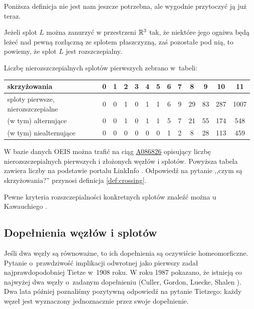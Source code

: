 Poniższa definicja nie jest nam jeszcze potrzebna, ale wygodnie przytoczyć ją już teraz.

\begin{definition}[rozszczepialność]
%
    Jeżeli splot $L$ można zanurzyć w przestrzeni $\mathbb R^3$ tak, że niektóre jego ogniwa będą leżeć nad pewną rozłączną ze splotem płaszczyzną, zaś pozostałe pod nią, to powiemy, że splot $L$ jest rozszczepialny.
\end{definition}

Liczbę nierozszczepialnych splotów pierwszych zebrano w~tabeli:

\renewcommand*{\arraystretch}{1.4}
\footnotesize
\begin{longtable}{lcccccccccccc}
    \hline
    \textbf{skrzyżowania} & 0 & 1 & 2 & 3 & 4 & 5 &  6 &  7 &  8 & 9 & 10 & 11 \\ \hline \endhead
    sploty pierwsze, nierozszczepialne & 0 & 0 & 1 & 0 & 1 & 1 & 6 & 9 & 29 & 83 & 287 & 1007 \\
    (w tym) alternujące & 0 & 0 & 1 & 0 & 1 & 1 & 5 & 7 & 21 & 55 & 174 & 548 \\
    (w tym) niealternujące & 0 & 0 & 0 & 0 & 0 & 0 & 1 & 2 & 8 & 28 & 113 & 459 \\
    \hline
\end{longtable}
\normalsize

W bazie danych OEIS można trafić na ciąg \href{https://oeis.org/A086826}{A086826} opisujący liczbę nierozszczepialnych pierwszych i złożonych węzłów i splotów.
Powyższa tabela zawiera liczby na podstawie portalu LinkInfo \cite{linkinfo23}.
Odpowiedź na pytanie ,,czym są skrzyżowania?'' przynosi definicja \ref{def:crossing}.

Pewne kryteria rozszczepialności konkretnych splotów znaleźć można u Kawauchiego \cite[s. 36-38]{kawauchi96}.

\subsection{Dopełnienia węzłów i splotów}

Jeśli dwa węzły są równoważne, to ich dopełnienia są oczywiście homeomorficzne.
Pytanie o~prawdziwość implikacji odwrotnej jako pierwszy zadał najprawdopodobniej Tietze \cite{tietze08} w~1908 roku.
%
W roku 1987 pokazano, że istnieją co najwyżej dwa węzły o~zadanym dopełnieniu (Culler, Gordon, Luecke, Shalen \cite{culler87}).
%
%
%
%
Dwa lata później poznaliśmy pozytywną odpowiedź na pytanie Tietzego: każdy węzeł jest wyznaczony jednoznacznie przez swoje dopełnienie.

